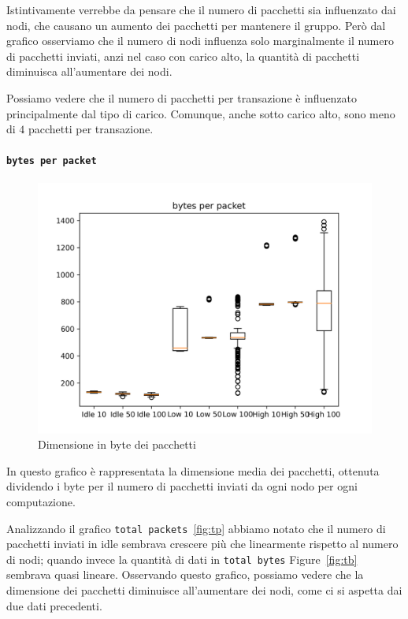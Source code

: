 \documentclass[12pt, a4paper]{article}
\begin{document}
Istintivamente verrebbe da pensare che il numero di pacchetti sia influenzato dai nodi, che causano un aumento dei pacchetti per mantenere il gruppo.
Però dal grafico osserviamo che il numero di nodi influenza solo marginalmente il numero di pacchetti inviati, anzi nel caso con carico alto, la quantità di pacchetti diminuisca all'aumentare dei nodi.

Possiamo vedere che il numero di pacchetti per transazione è influenzato principalmente dal tipo di carico. Comunque, anche sotto carico alto, sono meno di $4$ pacchetti per transazione.

\paragraph{\lstinline{bytes per packet}}

\begin{figure}[H]
    \includegraphics[width=\linewidth, keepaspectratio]{graphs/bytes per packet.png}
    \caption{Dimensione in byte dei pacchetti}
    \label{fig:bp}
\end{figure}

In questo grafico è rappresentata la dimensione media dei pacchetti, ottenuta dividendo i byte per il numero di pacchetti inviati da ogni nodo per ogni computazione.

Analizzando il grafico \lstinline{total packets}~\ref{fig:tp} abbiamo notato che il numero di pacchetti inviati in idle sembrava crescere più che linearmente rispetto al numero di nodi; quando invece la quantità di dati in \lstinline{total bytes} Figure~\ref{fig:tb} sembrava quasi lineare.
Osservando questo grafico, possiamo vedere che la dimensione dei pacchetti diminuisce all'aumentare dei nodi, come ci si aspetta dai due dati precedenti.
\end{document}
